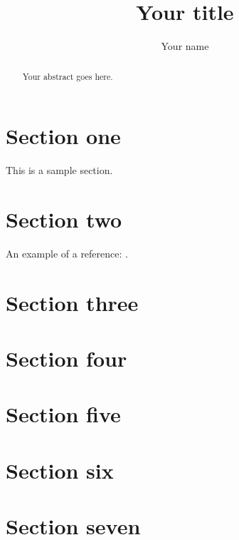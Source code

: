 \documentclass[11pt]{article} %
\title{Your title}
\author{Your name}
\theoremstyle{plain}
\theoremstyle{definition}
\begin{document}
\maketitle

\declaration

\begin{abstract}
  Your abstract goes here.
\end{abstract}

\section{Section one}

This is a sample section.

\section{Section two}

An example of a reference:
\cite{hastie/etal:2009}.

\section{Section three}
\section{Section four}
\section{Section five}
\section{Section six}
\section{Section seven}



\end{document}
